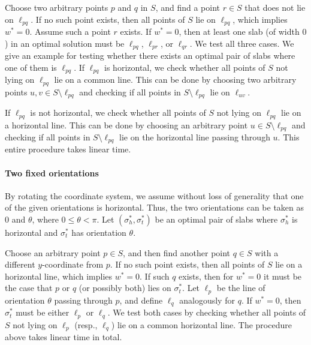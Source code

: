 \documentclass[10pt,a4paper]{article}
\theoremstyle{star}
\theoremstyle{claimstar}
\begin{document}
Choose two arbitrary points $p$ and $q$ in $S$, and find a point $r \in S$ that does not lie on $\ell_{pq}$. 
If no such point exists, then all points of $S$ lie on $\ell_{pq}$, which implies $w^* = 0$.
Assume such a point $r$ exists. 
If $w^* = 0$, then at least one slab (of width $0$) in an optimal solution must be $\ell_{pq}$, $\ell_{pr}$, or $\ell_{qr}$.
We test all three cases. 
We give an example for testing whether there exists an optimal pair of slabs where one of them is $\ell_{pq}$.
If $\ell_{pq}$ is horizontal, we check whether all points of $S$ not lying on $\ell_{pq}$ lie on a common line.
This can be done by choosing two arbitrary points $u, v \in S\setminus \ell_{pq}$ and checking if all points in $S\setminus \ell_{pq}$ lie on $\ell_{uv}$. 

If $\ell_{pq}$ is not horizontal, we check whether all points of $S$ not lying on $\ell_{pq}$ lie on a horizontal line.
This can be done by choosing an arbitrary point $u \in S\setminus \ell_{pq}$ and checking if all points in $S\setminus \ell_{pq}$ lie on the horizontal line passing through $u$. 
This entire procedure takes linear time.

\paragraph*{Two fixed orientations}
By rotating the coordinate system, we assume without loss of generality that one of the given orientations is horizontal. Thus, the two orientations can be taken as $0$ and $\theta$, where $0\le \theta < \pi$. Let $(\sigma_h^*, \sigma_t^* )$ be an optimal pair of slabs where $\sigma_h^*$ is horizontal and $\sigma_t^*$ has orientation $\theta$.

Choose an arbitrary point $p \in S$, and then find another point $q \in S$ with a different $y$-coordinate from $p$. If no such point exists, then all points of $S$ lie on a horizontal line, which implies $w^*=0$.
If such $q$ exists, then for $w^* = 0$ it must be the case that $p$ or $q$ (or possibly both) lies on $\sigma_t^*$.
Let $\ell_p$ be the line of orientation $\theta$ passing through $p$, and define $\ell_q$ analogously for $q$.
If $w^* = 0$, then $\sigma_t^*$ must be either $\ell_p$ or $\ell_q$.
We test both cases by checking whether all points of $S$ not lying on $\ell_p$ (resp., $\ell_q$) lie on a common horizontal line. 
The procedure above takes linear time in total.
\end{document}
